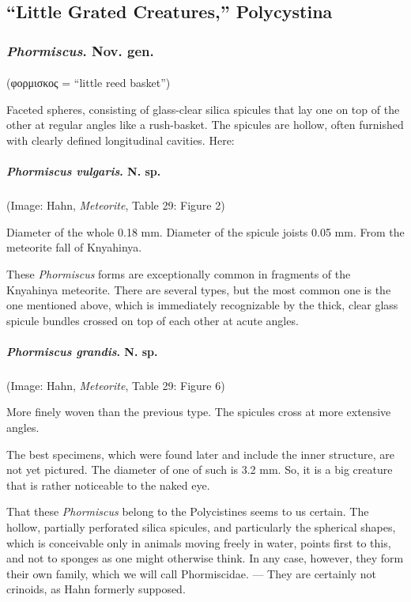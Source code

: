 \documentclass[a4paper, 12pt, oneside]{article}
\begin{document}
\subsection{``Little Grated Creatures,'' Polycystina}
\subsubsection{\emph{Phormiscus}. Nov. gen.}
\paragraph*{}
(φορμισκος = ``little reed basket'')%

Faceted spheres, consisting of glass-clear silica spicules that lay one on top of the other at regular angles like a rush-basket. The spicules are hollow, often furnished with clearly defined longitudinal cavities. Here:
\paragraph{\emph{Phormiscus vulgaris}. N. sp.}
\subparagraph{}
(Image: Hahn, \emph{Meteorite}, Table 29: Figure 2)

Diameter of the whole 0.18 mm. Diameter of the spicule joists 0.05 mm. From the meteorite fall of Knyahinya.

These \emph{Phormiscus} forms are exceptionally common in fragments of the Knyahinya meteorite. There are several types, but the most common one is the one mentioned above, which is immediately recognizable by the thick, clear glass spicule bundles crossed on top of each other at acute angles.
\paragraph{\emph{Phormiscus grandis}. N. sp.}
\subparagraph{}
(Image: Hahn, \emph{Meteorite}, Table 29: Figure 6)

More finely woven than the previous type. The spicules cross at more extensive angles.

The best specimens, which were found later and include the inner structure, are not yet pictured. The diameter of one of such is 3.2 mm. So, it is a big creature that is rather noticeable to the naked eye.

That these \emph{Phormiscus} belong to the Polycistines seems to us certain. The hollow, partially perforated silica spicules, and particularly the spherical shapes, which is conceivable only in animals moving freely in water, points first to this, and not to sponges as one might otherwise think. In any case, however, they form their own family, which we will call Phormiscidae. --- They are certainly not crinoids, as Hahn formerly supposed.
\end{document}
